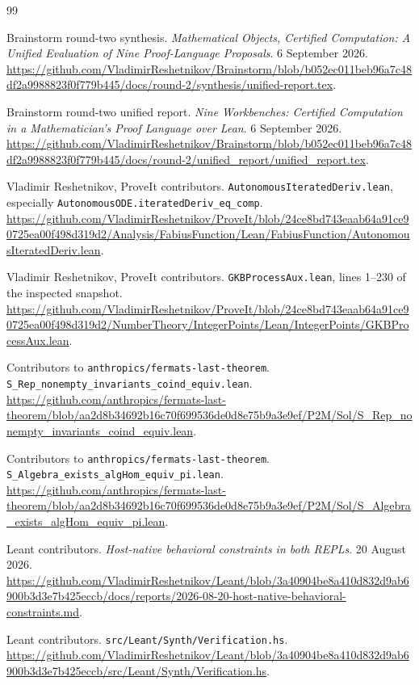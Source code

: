 \documentclass[11pt,letterpaper]{article}
\newcommand{\code}[1]{\nolinkurl{#1}}
\theoremstyle{definition}
\theoremstyle{remark}
\begin{document}
\begin{thebibliography}{99}
\small
{} Brainstorm round-two synthesis.
\emph{Mathematical Objects, Certified Computation: A Unified Evaluation of Nine
Proof-Language Proposals}. 6 September 2026.
\url{https://github.com/VladimirReshetnikov/Brainstorm/blob/b052ec011beb96a7c48df2a9988823f0f779b445/docs/round-2/synthesis/unified-report.tex}.

 Brainstorm round-two unified report.
\emph{Nine Workbenches: Certified Computation in a Mathematician's Proof Language
over Lean}. 6 September 2026.
\url{https://github.com/VladimirReshetnikov/Brainstorm/blob/b052ec011beb96a7c48df2a9988823f0f779b445/docs/round-2/unified_report/unified_report.tex}.

 Vladimir Reshetnikov, ProveIt contributors.
\code{AutonomousIteratedDeriv.lean}, especially
\code{AutonomousODE.iteratedDeriv_eq_comp}.
\url{https://github.com/VladimirReshetnikov/ProveIt/blob/24ce8bd743eaab64a91ce90725ea00f498d319d2/Analysis/FabiusFunction/Lean/FabiusFunction/AutonomousIteratedDeriv.lean}.

 Vladimir Reshetnikov, ProveIt contributors.
\code{GKBProcessAux.lean}, lines 1--230 of the inspected snapshot.
\url{https://github.com/VladimirReshetnikov/ProveIt/blob/24ce8bd743eaab64a91ce90725ea00f498d319d2/NumberTheory/IntegerPoints/Lean/IntegerPoints/GKBProcessAux.lean}.

 Contributors to \code{anthropics/fermats-last-theorem}.
\code{S_Rep_nonempty_invariants_coind_equiv.lean}.
\url{https://github.com/anthropics/fermats-last-theorem/blob/aa2d8b34692b16c70f699536de0d8e75b9a3e9ef/P2M/Sol/S_Rep_nonempty_invariants_coind_equiv.lean}.

 Contributors to \code{anthropics/fermats-last-theorem}.
\code{S_Algebra_exists_algHom_equiv_pi.lean}.
\url{https://github.com/anthropics/fermats-last-theorem/blob/aa2d8b34692b16c70f699536de0d8e75b9a3e9ef/P2M/Sol/S_Algebra_exists_algHom_equiv_pi.lean}.

 Leant contributors.
\emph{Host-native behavioral constraints in both REPLs}. 20 August 2026.
\url{https://github.com/VladimirReshetnikov/Leant/blob/3a40904be8a410d832d9ab6900b3d3e7b425eccb/docs/reports/2026-08-20-host-native-behavioral-constraints.md}.

 Leant contributors.
\code{src/Leant/Synth/Verification.hs}.
\url{https://github.com/VladimirReshetnikov/Leant/blob/3a40904be8a410d832d9ab6900b3d3e7b425eccb/src/Leant/Synth/Verification.hs}.


\end{thebibliography}
\end{document}
